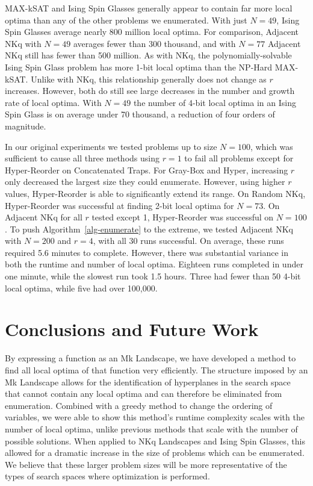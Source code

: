 \documentclass[runningheads,a4paper]{llncs}
\begin{document}
MAX-kSAT and Ising Spin Glasses generally appear to contain far more local optima than
any of the other problems we enumerated. With just $N=49$, Ising Spin Glasses average
nearly 800 million local optima. For comparison, Adjacent NKq with $N=49$ averages fewer than 300 thousand,
and with $N=77$ Adjacent NKq still has fewer than 500 million.
As with NKq, the polynomially-solvable Ising Spin
Glass problem has more 1-bit local optima than the NP-Hard MAX-kSAT. Unlike with NKq, this
relationship generally does not change as $r$ increases. However, both do still
see large decreases in the number and growth rate of local optima. With $N=49$
the number of 4-bit local optima in an Ising Spin Glass is on average under 70 thousand,
a reduction of four orders of magnitude.

In our original experiments we tested problems up to size $N=100$, which was sufficient to
cause all three methods using $r=1$ to fail all problems except for Hyper-Reorder on Concatenated
Traps. For Gray-Box and Hyper, increasing $r$ only decreased the largest size they could
enumerate.
However, using higher $r$ values, Hyper-Reorder is able to significantly extend its range.
On Random NKq, Hyper-Reorder was successful at finding 2-bit local optima for $N=73$. On Adjacent
NKq for all $r$ tested except 1, Hyper-Reorder was successful on $N=100$. To push Algorithm~\ref{alg-enumerate}
to the extreme, we tested Adjacent NKq with $N=200$ and $r=4$, with all 30 runs successful. On
average, these runs required 5.6 minutes to complete. However, there was substantial variance
in both the runtime and number of local optima. Eighteen runs completed in under one minute,
while the slowest run took 1.5 hours. Three had fewer than 50 4-bit local optima, while five
had over 100,000.


\section{Conclusions and Future Work}
By expressing a function as an Mk Landscape, we have developed a method to find all
local optima of that function very efficiently. The structure imposed by
an Mk Landscape allows for the identification of hyperplanes in the search space
that cannot contain any local optima and can therefore be eliminated from enumeration.
Combined with a greedy method to
change the ordering of variables, we were able to show
this method's runtime complexity scales with the number of local optima, unlike
previous methods that scale with the number of possible solutions.
When applied to NKq Landscapes and Ising Spin Glasses, this allowed for a dramatic
increase in the size of problems which can be enumerated. We believe that
these larger problem sizes will be more representative of the types
of search spaces where optimization is performed.
\end{document}
